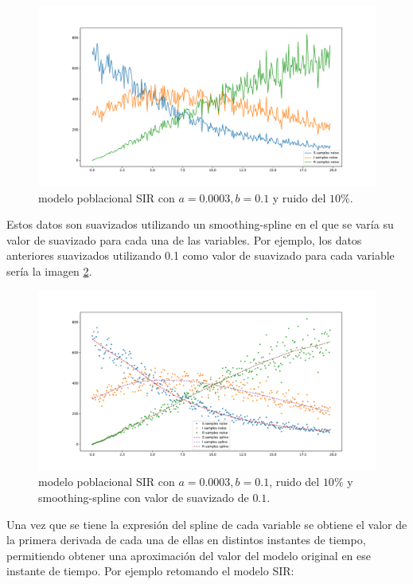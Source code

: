 \begin{figure}[h]
    \centering
    \includegraphics[width=\textwidth]{"figures/SIR_with_noise.pdf"}
    \caption{modelo poblacional SIR con $a = 0.0003, b = 0.1$ y ruido del $10\%$.}
    \label{fig:SIR_with_noise}
\end{figure}

Estos datos son suavizados utilizando un smoothing-spline en el que se varía su valor de suavizado para cada una de las variables. Por ejemplo, los datos anteriores suavizados utilizando 0.1 como valor de suavizado para cada variable sería la imagen \ref{fig:SIR_noise_with_spline}.

\begin{figure}[h]
    \centering
    \includegraphics[width=\textwidth]{"figures/SIR_noise_with_spline.pdf"}
    \caption{modelo poblacional SIR con $a = 0.0003, b = 0.1$, ruido del $10\%$ y smoothing-spline con valor de suavizado de $0.1$.}
    \label{fig:SIR_noise_with_spline}
\end{figure}

Una vez que se tiene la expresión del spline de cada variable se obtiene el valor de la primera derivada de cada una de ellas en distintos instantes de tiempo, permitiendo obtener una aproximación del valor del modelo original en ese instante de tiempo. Por ejemplo retomando el modelo SIR:

